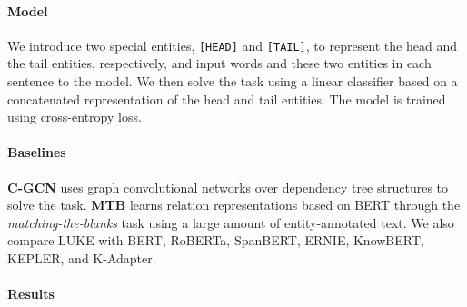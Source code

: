 \documentclass[11pt,a4paper]{article}
\begin{document}
\paragraph{Model}

We introduce two special entities, \texttt{[HEAD]} and \texttt{[TAIL]}, to represent the head and the tail entities, respectively, and input words and these two entities in each sentence to the model.
We then solve the task using a linear classifier based on a concatenated representation of the head and tail entities.
The model is trained using cross-entropy loss.

\paragraph{Baselines}

\textbf{C-GCN} \cite{Zhang2018GraphExtraction} uses graph convolutional networks over dependency tree structures to solve the task.
\textbf{MTB} \cite{BaldiniSoares2019MatchingLearning} learns relation representations based on BERT through the \textit{matching-the-blanks} task using a large amount of entity-annotated text.
We also compare LUKE with BERT, RoBERTa, SpanBERT, ERNIE, KnowBERT, KEPLER, and K-Adapter.

\paragraph{Results}
\end{document}
